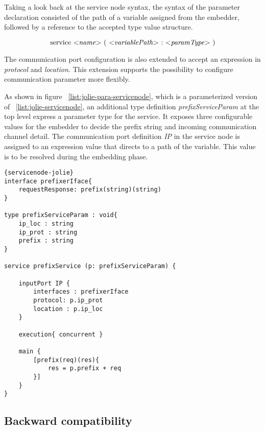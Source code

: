 Taking a look back at the service node syntax, the syntax of the parameter declaration consisted of the path of a variable assigned from the embedder, followed by a reference to the accepted type value structure.

\[
    \text{service $<$\textit{name}$>$ $($ $<$\textit{variablePath}$>$ $:$ $<$\textit{paramType}$>$ $)$}
\]

The communication port configuration is also extended to accept an expression in \textit{protocol} and \textit{location}. This extension supports the possibility to configure communication parameter more flexibly.

As shown in figure ~\ref{list:jolie-para-servicenode}, which is a parameterized version of ~\ref{list:jolie-servicenode}, an additional type definition \textit{prefixServiceParam} at the top level express a parameter type for the service. It exposes three configurable values for the embedder to decide the prefix string and incoming communication channel detail. The communication port definition \textit{IP} in the service node is assigned to an expression value that directs to a path of the variable. This value is to be resolved during the embedding phase.

\begin{listing}[ht]
    \lstset{language=Jolie,
        style=codeStyle,
        numbers=left,
        firstnumber=1
    }
    \begin{lstlisting}[frame=tlrb]{servicenode-jolie}
interface prefixerIface{
    requestResponse: prefix(string)(string)
}

type prefixServiceParam : void{
    ip_loc : string
    ip_prot : string
    prefix : string
}

service prefixService (p: prefixServiceParam) {
    
    inputPort IP {
        interfaces : prefixerIface
        protocol: p.ip_prot
        location : p.ip_loc
    }

    execution{ concurrent }

    main {
        [prefix(req)(res){
            res = p.prefix + req
        }]
    }
}
    \end{lstlisting}
    \caption{Jolie implementation of parameterize service node}
    \label{list:jolie-para-servicenode}
\end{listing}

\subsection{Backward compatibility}

